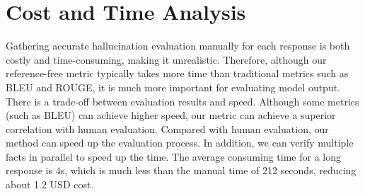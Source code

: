 \section{Cost and Time Analysis}
\label{app:cost}
{Gathering accurate hallucination evaluation manually for each response is both costly and time-consuming, making it unrealistic.   Therefore, although our reference-free metric typically takes more time than traditional metrics such as BLEU and ROUGE, it is much more important for evaluating model output. 
There is a trade-off between evaluation results and speed. Although some metrics (such as BLEU) can achieve higher speed, our metric can achieve a superior correlation with human evaluation. Compared with human evaluation, our method can speed up the evaluation process. In addition, we can verify multiple facts in parallel to speed up the time. The average consuming time for a long response is 4s, which is much less than the manual time of 212 seconds, reducing about 1.2 USD cost.}


	

 






